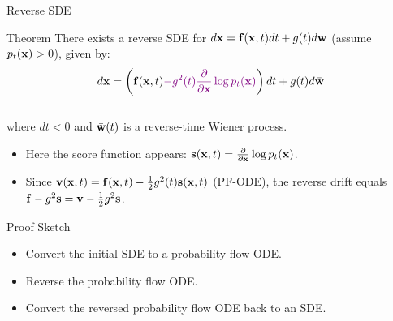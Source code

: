 \documentclass{beamer}
\begin{document}
\begin{frame}{Reverse SDE}
	\begin{block}{Theorem}
		There exists a reverse SDE for $d\mathbf{x} = \mathbf{f}(\mathbf{x}, t) dt + g(t) d \mathbf{w}$ (assume $p_t(\mathbf{x}) > 0$), given by:
		\vspace{-0.3cm}
		\[
			d\mathbf{x} = \left(\mathbf{f}(\mathbf{x}, t) {\color{violet}- g^2(t) \frac{\partial}{\partial \mathbf{x}}\log p_t(\mathbf{x})}\right) dt + g(t) d \bar{\mathbf{w}}
		\]
		\vspace{-0.5cm}\\
		where $dt<0$ and $\bar{\mathbf{w}}(t)$ is a reverse-time Wiener process.
	\end{block}
	\eqpause
	\begin{itemize}
		\item Here the score function appears: $\mathbf{s}(\mathbf{x}, t) = \frac{\partial}{\partial \mathbf{x}} \log p_t(\mathbf{x})$.
		\item Since $\mathbf{v}(\mathbf{x}, t) = \mathbf{f}(\mathbf{x}, t) - \frac{1}{2} g^2(t) \mathbf{s}(\mathbf{x}, t)$ (PF-ODE), the reverse drift equals $\mathbf{f} - g^2 \mathbf{s} = \mathbf{v} - \frac{1}{2} g^2 \mathbf{s}$.
	\end{itemize}
	\eqpause
	\begin{block}{Proof Sketch}
		\begin{itemize}
			\item Convert the initial SDE to a probability flow ODE.
			\item Reverse the probability flow ODE.
			\item Convert the reversed probability flow ODE back to an SDE.
		\end{itemize}
	\end{block}
\end{frame}
\end{document}

